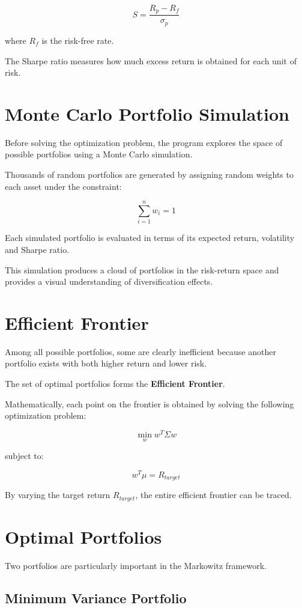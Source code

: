 \documentclass[11pt,a4paper]{article}
\begin{document}
\[
S = \frac{R_p - R_f}{\sigma_p}
\]

where \(R_f\) is the risk-free rate.

The Sharpe ratio measures how much excess return is obtained for each unit of risk.

\section{Monte Carlo Portfolio Simulation}

Before solving the optimization problem, the program explores the space of possible portfolios using a Monte Carlo simulation.

Thousands of random portfolios are generated by assigning random weights to each asset under the constraint:

\[
\sum_{i=1}^{n} w_i = 1
\]

Each simulated portfolio is evaluated in terms of its expected return, volatility and Sharpe ratio.

This simulation produces a cloud of portfolios in the risk-return space and provides a visual understanding of diversification effects.

\section{Efficient Frontier}

Among all possible portfolios, some are clearly inefficient because another portfolio exists with both higher return and lower risk.

The set of optimal portfolios forms the \textbf{Efficient Frontier}.

Mathematically, each point on the frontier is obtained by solving the following optimization problem:

\[
\min_w w^T \Sigma w
\]

subject to:

\[
w^T \mu = R_{target}
\]

By varying the target return \(R_{target}\), the entire efficient frontier can be traced.

\section{Optimal Portfolios}

Two portfolios are particularly important in the Markowitz framework.

\subsection{Minimum Variance Portfolio}
\end{document}
